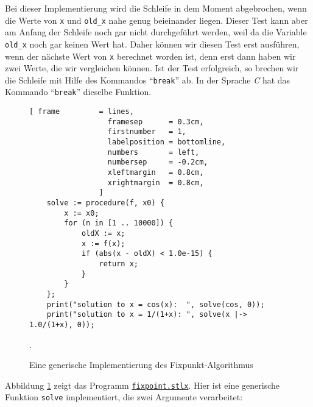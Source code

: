 Bei dieser Implementierung wird die Schleife in dem Moment abgebrochen, wenn die
Werte von \texttt{x} und \texttt{old\_x} nahe genug beieinander liegen.  Dieser
Test kann aber am Anfang der Schleife noch gar nicht durchgef\"{u}hrt werden, weil
da die Variable \texttt{old\_x} noch gar keinen Wert hat.  Daher k\"{o}nnen wir diesen Test 
erst ausf\"{u}hren, wenn der n\"{a}chste Wert von \texttt{x} berechnet worden ist, denn erst dann 
haben wir zwei Werte, die wir vergleichen k\"{o}nnen.  Ist der Test erfolgreich, so brechen wir die
Schleife mit Hilfe des  Kommandos ``\texttt{break}'' ab.  
In der Sprache \textsl{C} hat das Kommando ``\texttt{break}'' dieselbe Funktion.  


\begin{figure}[!ht]
\centering
\begin{Verbatim}[ frame         = lines, 
                  framesep      = 0.3cm, 
                  firstnumber   = 1,
                  labelposition = bottomline,
                  numbers       = left,
                  numbersep     = -0.2cm,
                  xleftmargin   = 0.8cm,
                  xrightmargin  = 0.8cm,
                ]
    solve := procedure(f, x0) {
        x := x0;
        for (n in [1 .. 10000]) {
            oldX := x;
            x := f(x);
            if (abs(x - oldX) < 1.0e-15) {
                return x;
            }
        }
    };
    print("solution to x = cos(x):  ", solve(cos, 0));
    print("solution to x = 1/(1+x): ", solve(x |-> 1.0/(1+x), 0));
\end{Verbatim}
\vspace*{-0.3cm}
\caption{Eine generische Implementierung des Fixpunkt-Algorithmus}.
\label{fig:fixpoint.stlx}
\end{figure}

Abbildung \ref{fig:fixpoint.stlx} zeigt das Programm
\href{https://github.com/karlstroetmann/Logik/blob/master/SetlX/fixpoint.stlx}{\texttt{fixpoint.stlx}}.
Hier ist eine generische Funktion \texttt{solve} implementiert, die zwei Argumente verarbeitet: 


